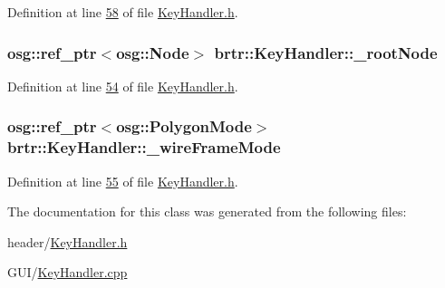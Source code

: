 Definition at line \hyperlink{_key_handler_8h_source_l00058}{58} of file \hyperlink{_key_handler_8h_source}{Key\+Handler.\+h}.

\hypertarget{classbrtr_1_1_key_handler_a2ff68d9c79145d235f50fec1da625f99}{
\subsubsection[{\+\_\+root\+Node}]{\setlength{\rightskip}{0pt plus 5cm}osg\+::ref\+\_\+ptr$<$osg\+::\+Node$>$ brtr\+::\+Key\+Handler\+::\+\_\+root\+Node\hspace{0.3cm}{\ttfamily [private]}}}\label{classbrtr_1_1_key_handler_a2ff68d9c79145d235f50fec1da625f99}


Definition at line \hyperlink{_key_handler_8h_source_l00054}{54} of file \hyperlink{_key_handler_8h_source}{Key\+Handler.\+h}.

\hypertarget{classbrtr_1_1_key_handler_a7aff4e23d4c614d8e0ccdc29a3c8882f}{
\subsubsection[{\+\_\+wire\+Frame\+Mode}]{\setlength{\rightskip}{0pt plus 5cm}osg\+::ref\+\_\+ptr$<$osg\+::\+Polygon\+Mode$>$ brtr\+::\+Key\+Handler\+::\+\_\+wire\+Frame\+Mode\hspace{0.3cm}{\ttfamily [private]}}}\label{classbrtr_1_1_key_handler_a7aff4e23d4c614d8e0ccdc29a3c8882f}


Definition at line \hyperlink{_key_handler_8h_source_l00055}{55} of file \hyperlink{_key_handler_8h_source}{Key\+Handler.\+h}.



The documentation for this class was generated from the following files\+:\begin{DoxyCompactItemize}
\item 
header/\hyperlink{_key_handler_8h}{Key\+Handler.\+h}\item 
G\+U\+I/\hyperlink{_key_handler_8cpp}{Key\+Handler.\+cpp}\end{DoxyCompactItemize}
